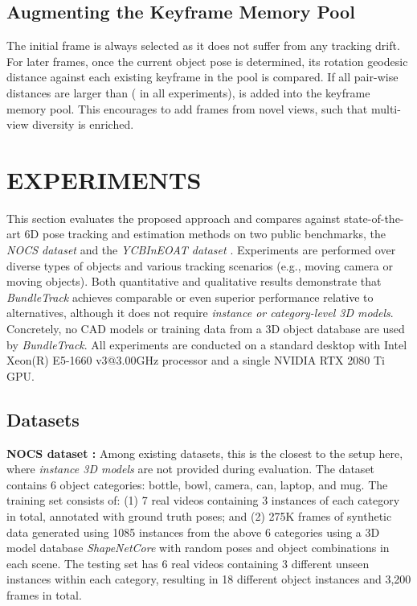 \documentclass[letterpaper, 10 pt, conference]{ieeeconf}
\begin{document}
\subsection{Augmenting the Keyframe Memory Pool}
The initial frame  is always selected as it does not suffer from any tracking drift. For later frames, once the current object pose  is determined, its rotation geodesic distance against each existing keyframe in the pool is compared. If all pair-wise distances are larger than  ( in all experiments),  is added into the keyframe memory pool. This encourages to add frames from novel views, such that multi-view diversity is enriched.  
\section{EXPERIMENTS}
This  section  evaluates  the  proposed  approach  and  compares  against state-of-the-art 6D pose tracking and estimation methods on two public benchmarks, the \textit{NOCS dataset} \cite{Wang_2019_CVPR} and the \textit{YCBInEOAT dataset} \cite{wense3tracknet}. Experiments are performed over diverse types of objects and various tracking scenarios (e.g., moving camera or moving objects). Both quantitative and qualitative results demonstrate that \textit{BundleTrack} achieves comparable or even superior performance relative to alternatives, although it does not require \textit{instance or category-level 3D models}. Concretely, no CAD models or training data from a 3D object database are used by \textit{BundleTrack}. All  experiments are  conducted on a standard desktop with Intel  Xeon(R) E5-1660 v3@3.00GHz  processor and a single NVIDIA RTX 2080 Ti GPU. 

\subsection{Datasets}


\noindent \textbf{NOCS dataset \cite{Wang_2019_CVPR}:} Among existing datasets, this is the closest to the setup here, where \textit{instance 3D models} are not provided during evaluation. The dataset contains 6 object categories: bottle, bowl, camera, can, laptop, and mug.  The training set consists of: (1) 7 real videos containing 3 instances of each category in total, annotated with ground truth poses; and (2) 275K frames of synthetic data generated using 1085 instances from the above 6 categories using a 3D model database \textit{ShapeNetCore} \cite{chang2015shapenet} with random poses and object combinations in each scene.  The testing set has 6 real videos containing 3 different unseen instances within each category, resulting in 18 different object instances and 3,200 frames in total. 
\end{document}
